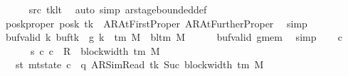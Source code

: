 \begin{isabellebody}
\ \ \ \ \isamarkupfalse%
\ src{}\ tk{\isacharunderscore}{\kern0pt}lt\ \isamarkupfalse%
\ {\isacharparenleft}{\kern0pt}auto\ simp{\isacharcolon}{\kern0pt}\ ar{\isacharunderscore}{\kern0pt}stage{\isacharunderscore}{\kern0pt}bounded{\isacharunderscore}{\kern0pt}def{\isacharparenright}{\kern0pt}\isanewline
\ \ \isamarkupfalse%
\ posk{\isacharprime}{\kern0pt}{\isacharunderscore}{\kern0pt}proper{\isacharcolon}{\kern0pt}\ {\isachardoublequoteopen}{\isacharquery}{\kern0pt}posk{\isacharprime}{\kern0pt}\ tk\ {\isasymin}\ {\isacharbraceleft}{\kern0pt}AR{\isacharunderscore}{\kern0pt}AtFirstProper{\isacharcomma}{\kern0pt}\ AR{\isacharunderscore}{\kern0pt}AtFurtherProper{\isacharbraceright}{\kern0pt}{\isachardoublequoteclose}\ \isamarkupfalse%
\ simp\isanewline
\ \ \isamarkupfalse%
\ buf{}{\isacharunderscore}{\kern0pt}valid{\isacharcolon}{\kern0pt}\ {\isachardoublequoteopen}{\isasymforall}k{\isachardot}{\kern0pt}\ {\isacharparenleft}{\kern0pt}buf{\isacharparenleft}{\kern0pt}tk\ {\isacharcolon}{\kern0pt}{\isacharequal}{\kern0pt}\ {\isacharquery}{\kern0pt}g{}{\isacharparenright}{\kern0pt}{\isacharparenright}{\kern0pt}\ k\ {\isasymin}\ {\isasymGamma}{\isacharunderscore}{\kern0pt}tm\ M\ {\isasymunion}\ {\isacharbraceleft}{\kern0pt}bl{\isacharunderscore}{\kern0pt}tm\ M{\isacharbraceright}{\kern0pt}{\isachardoublequoteclose}\isanewline
\ \ \ \ \isamarkupfalse%
\ buf{\isacharunderscore}{\kern0pt}valid\ g{}{\isacharunderscore}{\kern0pt}mem\ \isamarkupfalse%
\ simp\isanewline
\ \ \isamarkupfalse%
\ c{}\ \isanewline
\ \ \ \ \ \ s{}{\isacharcolon}{\kern0pt}\ {\isachardoublequoteopen}{\isacharparenleft}{\kern0pt}c{}{\isacharcomma}{\kern0pt}\ c{}{\isacharparenright}{\kern0pt}\ {\isasymin}\ R{\isacharprime}{\kern0pt}\ {\isacharcircum}{\kern0pt}{\isacharcircum}{\kern0pt}\ {\isacharparenleft}{\kern0pt}block{\isacharunderscore}{\kern0pt}width\ {\isacharparenleft}{\kern0pt}{\isasymGamma}{\isacharunderscore}{\kern0pt}tm\ M{\isacharparenright}{\kern0pt}\ {\isacharminus}{\kern0pt}\ {}{\isacharparenright}{\kern0pt}{\isachardoublequoteclose}\isanewline
\ \ \ st{}{\isacharcolon}{\kern0pt}\ {\isachardoublequoteopen}mt{\isacharunderscore}{\kern0pt}state\ c{}\ {\isacharequal}{\kern0pt}\ {\isacharparenleft}{\kern0pt}q{\isacharcomma}{\kern0pt}\ AR{\isacharunderscore}{\kern0pt}SimRead{\isacharcomma}{\kern0pt}\ tk{\isacharcomma}{\kern0pt}\ Suc\ {\isacharparenleft}{\kern0pt}block{\isacharunderscore}{\kern0pt}width\ {\isacharparenleft}{\kern0pt}{\isasymGamma}{\isacharunderscore}{\kern0pt}tm\ M{\isacharparenright}{\kern0pt}{\isacharparenright}{\kern0pt}{\isacharcomma}{\kern0pt}\isanewline

\end{isabellebody}

